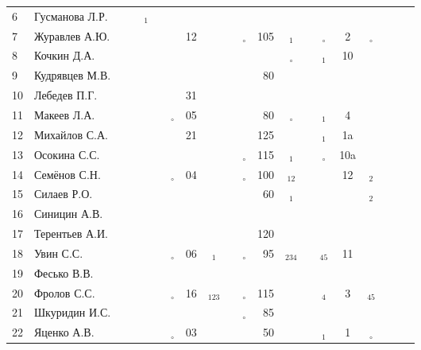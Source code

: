 \documentclass[a4paper,11pt]{article}
\newcommand*\OK{&\small \ding{51}$\!\!_\circ$} %
\newcommand*\Ok{&\small \ding{51}$\!\!_\circ$} %
\newcommand*\ok{&{\small \ding{51}}} %
\newcommand*\no{&{\small }} %
\newcommand*\da{&{\small\ding{48}$\!\!_1$}} %
\newcommand*\ab{&{\small\ding{48}$\!\!_{12}$}} %
\newcommand*\dabc{&{\small\ding{48}$\!\!_{123}$}} %
\newcommand*\db{&{\small\ding{48}$\!\!_2$}} %
\newcommand*\dd{&{\small\ding{48}$\!\!_4$}} %
\newcommand*\bd{&{\small\ding{48}$\!\!_{234}$}} %
\newcommand*\de{&{\small\ding{48}$\!\!_{45}$}} %
\begin{document}
\begin{tabular}{l|l|cccccccccrcccccccc}
 6&Гусманова Л.Р.  \ok\ok\da\ok\no\no\no  \no\no \no\no\no\no \no\no&&&\\
 7&Журавлев А.Ю.   \no\no\no\no\ok&12\ok  \ok\OK&105\da\ok\Ok&  2\Ok&&&\\
 8&Кочкин Д.А.     \no\no\no\no\ok\ok\no  \ok\no \no\Ok\no\da& 10\no&&&\\
 9&Кудрявцев М.В.  \no\no\ok\ok\no\no\no  \ok\ok& 80\ok\ok\no \no\no&&&\\
10&Лебедев П.Г.    \ok\ok\no\ok\ok&31\no  \ok\no \no\no\no\no \no\no&&&\\
11&Макеев Л.А.     \ok\ok\ok\ok\OK&05\ok  \ok\ok& 80\Ok\ok\da&  4\ok&&&\\
12&Михайлов С.А.   \no\no\ok\ok\ok&21\no  \ok\ok&125\ok\ok\da& 1a\ok&&&\\
13&Осокина С.С.    \ok\ok\ok\ok\no\no\ok  \ok\OK&115\da\no\Ok&10a\ok&&&\\
14&Семёнов С.Н.    \ok\ok\ok\ok\OK&04\ok  \ok\OK&100\ab\ok\ok& 12\db&&&\\
15&Силаев Р.О.     \ok\ok\no\no\no\no\no  \no\ok& 60\da\ok\no \no\db&&&\\
16&Синицин А.В.    \ok\ok\no\ok\no\no\no  \no\no \no\no\no\no \no\no&&\\
17&Терентьев А.И.  \ok\ok\ok\ok\no\no\no  \no\ok&120\no\no\no \no\no&&&\\
18&Увин С.С.       \ok\ok\ok\ok\OK&06\da  \ok\OK& 95\bd\ok\de& 11\ok&&&\\
19&Фесько В.В.     \no\no\no\no\no\no\no  \no\no \no\no\no\no \no\no&&&\\
20&Фролов С.С.     \ok\ok\ok\ok\OK&16\dabc\ok\OK&115\ok\ok\dd&  3\de&&&\\ 
21&Шкуридин И.С.   \ok\ok\ok\ok\ok\no\ok  \ok\OK& 85\ok\ok\no \no\ok&&&\\
22&Яценко А.В.     \ok\ok\ok\ok\OK&03\ok  \ok\ok& 50\ok\ok\da&  1\Ok&&&\\ 
\bottomrule
\end{tabular} 
\newpage
\end{document}
